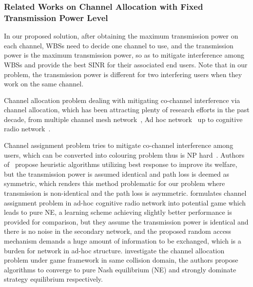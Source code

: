 \documentclass[times]{ettauth}
\theoremstyle{mytheoremstyle}
\theoremstyle{mytheoremstyle}
\theoremstyle{mytheoremstyle}
\begin{document}
\subsubsection*{Related Works on Channel Allocation with Fixed Transmission Power Level}
\label{CA}
In our proposed solution, after obtaining the maximum transmission power on each channel, WBSs need to decide one channel to use, and the transmission power is the maximum transmission power, so as to mitigate interference among WBSs and provide the best SINR for their associated end users.
Note that in our problem, the transmission power is different for two interfering users when they work on the same channel.

Channel allocation problem dealing with mitigating co-channel interference via channel allocation, which has been attracting plenty of research efforts in the past decade, from multiple channel mesh network~\cite{Hyacinth}, Ad hoc network~\cite{Ko_DistributedCA} up to cognitive radio network~\cite{SA_CA_TVWS_2012crowncom,qlearning_huang}. 

Channel assignment problem tries to mitigate co-channel interference among users, which can be converted into colouring problem thus is NP hard~\cite{Hyacinth}. 
Authors of~\cite{Ko_DistributedCA} propose heuristic algorithms utilizing best response to improve its welfare, but the transmission power is assumed identical and path loss is deemed as symmetric, which renders this method problematic for our problem where transmission is non-identical and the path loss is asymmetric.
\cite{CApotentialLearning_05dyspan} formulates channel assignment problem in ad-hoc cognitive radio network into potential game which leads to pure NE, a learning scheme achieving slightly better performance is provided for comparison, but they assume the transmission power is identical and there is no noise in the secondary network, and the proposed random access mechanism demands a huge amount of information to be exchanged, which is a burden for network in ad-hoc structure.
\cite{CA_Felegyhazi_07infocom, Wu_GOP_CA_08infocom} investigate the channel allocation problem under game framework in same collision domain, the authors propose algorithms to converge to pure Nash equilibrium (NE) and strongly dominate strategy equilibrium respectively. 
\end{document}
